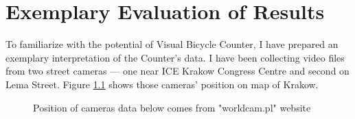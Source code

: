 \chapter{Exemplary Evaluation of Results}
\label{cha:results}
To familiarize with the potential of Visual Bicycle Counter, I have prepared an exemplary interpretation of the Counter's data. I have been collecting video files from two street cameras --- one near ICE Krakow Congress Centre and second on Lema Street. Figure \ref{fig:map} shows those cameras' position on map of Krakow.
\begin{figure}[H]
    \centering
    \caption{Position of cameras data below comes from "worldcam.pl" website\cite{mapa}}
    \label{fig:map}
\end{figure}

